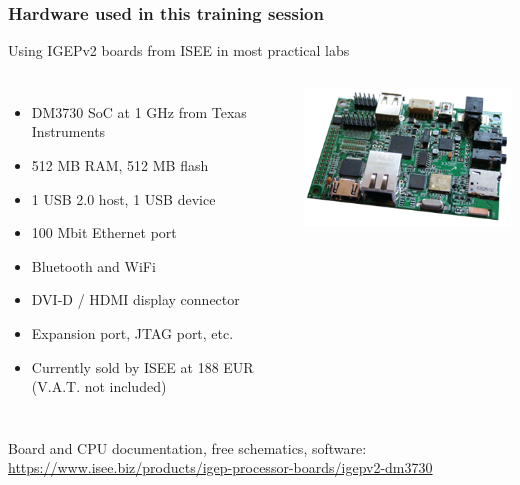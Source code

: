 \begin{frame}
\frametitle{Hardware used in this training session}
  Using IGEPv2 boards from ISEE in most practical labs
  \begin{columns}
    \begin{itemize}
      \item DM3730 SoC at 1 GHz from Texas Instruments
      \item 512 MB RAM, 512 MB flash
      \item 1 USB 2.0 host, 1 USB device
      \item 100 Mbit Ethernet port
      \item Bluetooth and WiFi
      \item DVI-D / HDMI display connector
      \item Expansion port, JTAG port, etc.
      \item Currently sold by ISEE at 188 EUR (V.A.T. not included)
    \end{itemize}
    \includegraphics[width=\textwidth]{slides/igepv2-board/igepv2-board.png}
  \end{columns}
  \vspace{1em}
  {\small
  Board and CPU documentation, free schematics, software:
  \url{https://www.isee.biz/products/igep-processor-boards/igepv2-dm3730}
  }
\end{frame}
